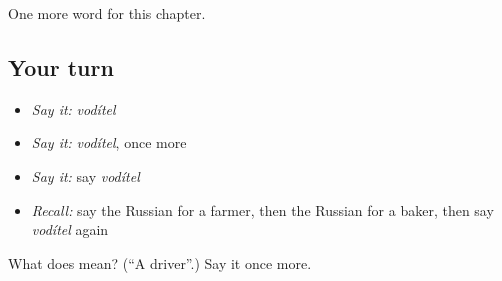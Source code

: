\begin{grammarlens}[title={What you've built}]
One more word for this chapter.
\end{grammarlens}

\subsection*{Your turn}
\begin{itemize}
\raggedright
  \item \emph{Say it:} \emph{vodítel}
  \item \emph{Say it:} \emph{vodítel}, once more
  \item \emph{Say it:} say \emph{vodítel}
  \item \emph{Recall:} say the Russian for a farmer, then the Russian for a baker, then say \emph{vodítel} again
\end{itemize}

\begin{tcolorbox}[breakable,colback=teal!4,colframe=teal!35!black,title={Before you move on}]
What does  mean? (\textquotedblleft{}A driver\textquotedblright{}.) Say it once more.
\end{tcolorbox}
